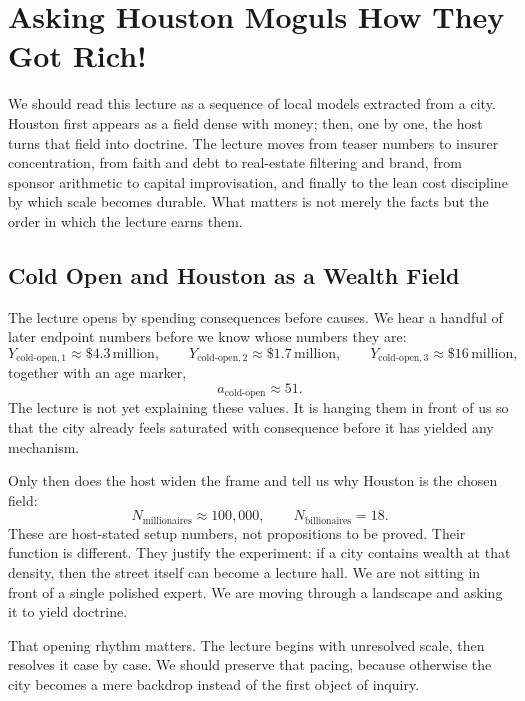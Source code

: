 \chapter{Asking Houston Moguls How They Got Rich!}

We should read this lecture as a sequence of local models extracted from a city. Houston first appears as a field dense with money; then, one by one, the host turns that field into doctrine. The lecture moves from teaser numbers to insurer concentration, from faith and debt to real-estate filtering and brand, from sponsor arithmetic to capital improvisation, and finally to the lean cost discipline by which scale becomes durable. What matters is not merely the facts but the order in which the lecture earns them.

\section{Cold Open and Houston as a Wealth Field}

The lecture opens by spending consequences before causes. We hear a handful of later endpoint numbers before we know whose numbers they are:
\begin{equation}
Y_{\text{cold-open},1} \approx \$4.3\,\text{million},\qquad
Y_{\text{cold-open},2} \approx \$1.7\,\text{million},\qquad
Y_{\text{cold-open},3} \approx \$16\,\text{million},
\end{equation}
together with an age marker,
\begin{equation}
a_{\text{cold-open}} \approx 51.
\end{equation}
The lecture is not yet explaining these values. It is hanging them in front of us so that the city already feels saturated with consequence before it has yielded any mechanism.

Only then does the host widen the frame and tell us why Houston is the chosen field:
\begin{equation}
N_{\text{millionaires}} \approx 100{,}000,\qquad
N_{\text{billionaires}} = 18.
\end{equation}
These are host-stated setup numbers, not propositions to be proved. Their function is different. They justify the experiment: if a city contains wealth at that density, then the street itself can become a lecture hall. We are not sitting in front of a single polished expert. We are moving through a landscape and asking it to yield doctrine.

That opening rhythm matters. The lecture begins with unresolved scale, then resolves it case by case. We should preserve that pacing, because otherwise the city becomes a mere backdrop instead of the first object of inquiry.

